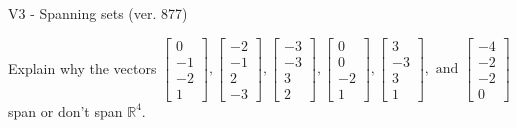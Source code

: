 \begin{exercise}
  \begin{exerciseTitle}V3 - Spanning sets (ver. 877)\end{exerciseTitle}
  \begin{exerciseStatement}
    Explain why the vectors \(\left[\begin{array}{r}
0 \\
-1 \\
-2 \\
1
\end{array}\right] , \left[\begin{array}{r}
-2 \\
-1 \\
2 \\
-3
\end{array}\right] , \left[\begin{array}{r}
-3 \\
-3 \\
3 \\
2
\end{array}\right] , \left[\begin{array}{r}
0 \\
0 \\
-2 \\
1
\end{array}\right] , \left[\begin{array}{r}
3 \\
-3 \\
3 \\
1
\end{array}\right] , \text{ and } \left[\begin{array}{r}
-4 \\
-2 \\
-2 \\
0
\end{array}\right]\) span or don't span \(\mathbb{R}^4\). 
	



\end{exerciseStatement}
\end{exercise}
